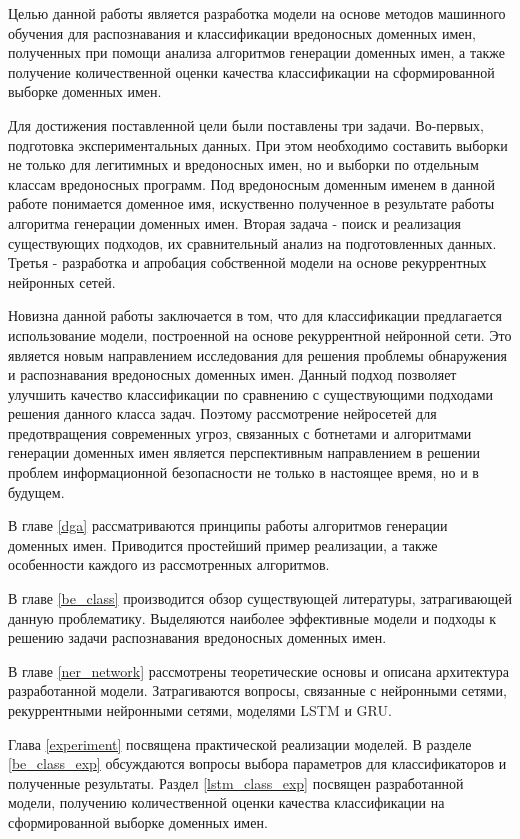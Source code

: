 Целью данной работы является разработка модели на основе методов машинного обучения для распознавания и классификации вредоносных доменных имен, полученных при помощи анализа алгоритмов генерации доменных имен, а также получение количественной оценки качества классификации на сформированной выборке доменных имен.

Для достижения поставленной цели были поставлены три задачи. Во-первых, подготовка экспериментальных данных. При этом необходимо составить выборки не только для легитимных и вредоносных имен, но и выборки по отдельным классам вредоносных программ. Под вредоносным доменным именем в данной работе понимается доменное имя, искуственно полученное в результате работы алгоритма генерации доменных имен. Вторая задача - поиск и реализация существующих подходов, их сравнительный анализ на подготовленных данных. Третья - разработка и апробация собственной модели на основе рекуррентных нейронных сетей.

Новизна данной работы заключается в том, что для классификации предлагается использование модели, построенной на основе рекуррентной нейронной сети. Это является новым направлением исследования для решения проблемы обнаружения и распознавания вредоносных доменных имен. Данный подход позволяет улучшить качество классификации по сравнению с существующими подходами решения данного класса задач. Поэтому рассмотрение нейросетей для предотвращения современных угроз, связанных с ботнетами и алгоритмами генерации доменных имен является перспективным направлением в решении проблем информационной безопасности не только в настоящее время, но и в будущем.

В главе \ref{dga} рассматриваются принципы работы алгоритмов генерации доменных имен. Приводится простейший пример реализации, а также особенности каждого из рассмотренных алгоритмов.

В главе \ref{be_class} производится обзор существующей литературы, затрагивающей данную проблематику. Выделяются наиболее эффективные модели и подходы к решению задачи распознавания вредоносных доменных имен.

В главе \ref{ner_network} рассмотрены теоретические основы и описана архитектура разработанной модели. Затрагиваются вопросы, связанные с нейронными сетями, рекуррентными нейронными сетями, моделями LSTM и GRU.

Глава \ref{experiment} посвящена практической реализации моделей. В разделе \ref{be_class_exp} обсуждаются вопросы выбора параметров для классификаторов и полученные результаты. Раздел \ref{lstm_class_exp} посвящен разработанной модели, получению количественной оценки качества классификации на сформированной выборке доменных имен.
\clearpage
